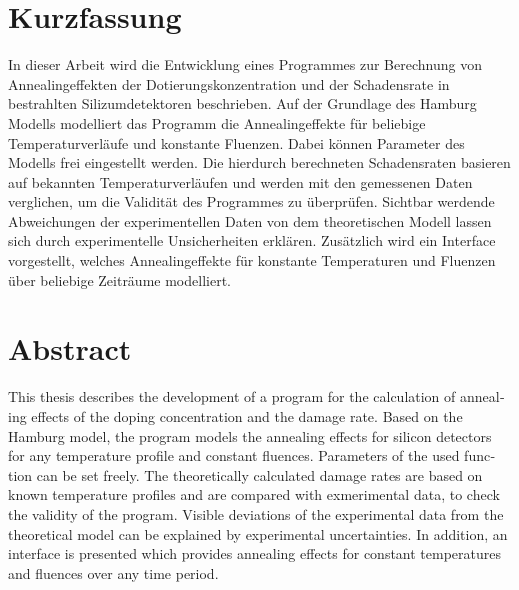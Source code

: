 \thispagestyle{plain}

\section*{Kurzfassung}
In dieser Arbeit wird die Entwicklung eines Programmes zur
Berechnung von Annealingeffekten der Dotierungskonzentration und der Schadensrate in bestrahlten
Silizumdetektoren
beschrieben. Auf der Grundlage des Hamburg Modells modelliert das Programm die Annealingeffekte für beliebige
Temperaturverläufe und konstante Fluenzen.
Dabei können Parameter des Modells frei eingestellt werden.
Die hierdurch berechneten Schadensraten basieren auf bekannten Temperaturverläufen und werden mit den gemessenen Daten verglichen,
um die Validität des Programmes zu überprüfen. Sichtbar werdende Abweichungen der
experimentellen Daten von dem theoretischen Modell lassen sich durch experimentelle Unsicherheiten erklären.
Zusätzlich wird ein Interface vorgestellt, welches Annealingeffekte für konstante Temperaturen und Fluenzen
über beliebige Zeiträume modelliert.

\section*{Abstract}
\begin{english}
  This thesis describes the development of a program for the calculation of annealing effects of the doping concentration and the damage rate.
  Based on the Hamburg model, the program models the annealing effects for silicon detectors for any temperature profile and constant fluences.
  Parameters of the used function can be set freely.
  The theoretically calculated damage rates are based on known temperature profiles and are compared with exmerimental data,
  to check the validity of the program.
   Visible deviations of the experimental data from the theoretical model can be explained by experimental uncertainties. In addition, an interface
   is presented which provides annealing effects for constant temperatures and fluences over any time period.



\end{english}
